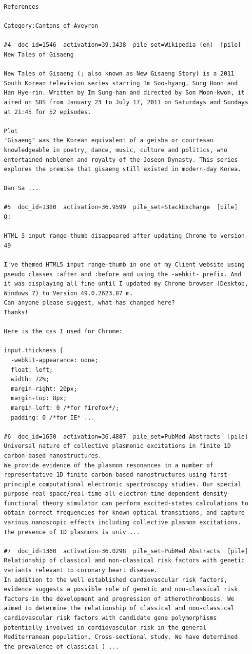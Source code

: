 \begin{verbatim}
References

Category:Cantons of Aveyron

#4  doc_id=1546  activation=39.3438  pile_set=Wikipedia (en)  [pile]
New Tales of Gisaeng

New Tales of Gisaeng (; also known as New Gisaeng Story) is a 2011 South Korean television series starring Im Soo-hyang, Sung Hoon and Han Hye-rin. Written by Im Sung-han and directed by Son Moon-kwon, it aired on SBS from January 23 to July 17, 2011 on Saturdays and Sundays at 21:45 for 52 episodes.

Plot
"Gisaeng" was the Korean equivalent of a geisha or courtesan knowledgeable in poetry, dance, music, culture and politics, who entertained noblemen and royalty of the Joseon Dynasty. This series explores the premise that gisaeng still existed in modern-day Korea.

Dan Sa ...

#5  doc_id=1380  activation=36.9599  pile_set=StackExchange  [pile]
Q:

HTML 5 input range-thumb disappeared after updating Chrome to version-49

I've themed HTML5 input range-thumb in one of my Client website using pseudo classes :after and :before and using the -webkit- prefix. And it was displaying all fine until I updated my Chrome browser (Desktop, Windows 7) to Version 49.0.2623.87 m.
Can anyone please suggest, what has changed here?
Thanks!

Here is the css I used for Chrome:

input.thickness {
  -webkit-appearance: none;
  float: left;
  width: 72%;
  margin-right: 20px;
  margin-top: 8px;
  margin-left: 0 /*for firefox*/;
  padding: 0 /*for IE* ...

#6  doc_id=1650  activation=36.4887  pile_set=PubMed Abstracts  [pile]
Universal nature of collective plasmonic excitations in finite 1D carbon-based nanostructures.
We provide evidence of the plasmon resonances in a number of representative 1D finite carbon-based nanostructures using first-principle computational electronic spectroscopy studies. Our special purpose real-space/real-time all-electron time-dependent density-functional theory simulator can perform excited-states calculations to obtain correct frequencies for known optical transitions, and capture various nanoscopic effects including collective plasmon excitations. The presence of 1D plasmons is univ ...

#7  doc_id=1360  activation=36.0298  pile_set=PubMed Abstracts  [pile]
Relationship of classical and non-classical risk factors with genetic variants relevant to coronary heart disease.
In addition to the well established cardiovascular risk factors, evidence suggests a possible role of genetic and non-classical risk factors in the development and progression of atherothrombosis. We aimed to determine the relationship of classical and non-classical cardiovascular risk factors with candidate gene polymorphisms potentially involved in cardiovascular risk in the general Mediterranean population. Cross-sectional study. We have determined the prevalence of classical ( ...


\end{verbatim}

